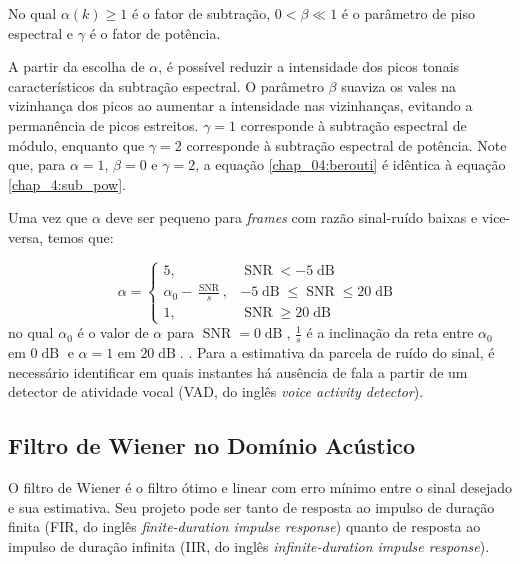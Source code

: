 No qual $\alpha(k) \geq 1$  é o fator de subtração, $0 < \beta \ll 1 $ é o
parâmetro de piso espectral\cite{berouti1979enhancement} e $\gamma$ é o fator de potência.

A partir da escolha de $\alpha$, é possível reduzir a intensidade dos picos
tonais característicos da subtração espectral. O parâmetro $\beta$ suaviza os
vales na vizinhança dos picos ao aumentar a intensidade nas vizinhanças,
evitando a permanência de picos estreitos.
$\gamma = 1$ corresponde
à subtração espectral de módulo, enquanto que $\gamma = 2$ corresponde à
subtração espectral de potência. Note que, para $\alpha = 1$, $\beta = 0$ e
$\gamma = 2$, a equação \eqref{chap_04:berouti} é idêntica à equação
\eqref{chap_4:sub_pow}.


Uma vez que $\alpha$ deve ser pequeno para \textit{frames} com razão sinal-ruído
baixas e vice-versa, temos que:

\begin{equation}
    \alpha = 
    \begin{cases}
        5, & \operatorname{SNR} < -5\operatorname{dB} \\
        \alpha_0 - \frac{\operatorname{SNR}}{s}, & -5\operatorname{dB} \leq \operatorname{SNR} \leq 20\operatorname{dB}\\
        1, & \operatorname{SNR} \geq 20\operatorname{dB}
    \end{cases}
\end{equation}
no qual $\alpha_0$ é o valor de $\alpha$ para $\operatorname{SNR} =
0\operatorname{dB}$, $\frac{1}{s}$ é a inclinação da reta entre $\alpha_0$ em
$0\operatorname{dB}$ e $\alpha = 1$ em $20\operatorname{dB}$. . Para a estimativa da parcela de ruído do sinal, é
necessário identificar em quais instantes há ausência de fala a partir de um
detector de atividade vocal (VAD, do inglês \textit{voice activity detector}).


\subsection{Filtro de Wiener no Domínio Acústico}

O filtro de Wiener é o filtro ótimo e linear com erro mínimo entre o sinal
desejado e sua estimativa. Seu projeto pode ser tanto de resposta ao impulso de
duração finita (FIR, do inglês \textit{finite-duration impulse response}) quanto
de resposta ao impulso de duração infinita (IIR, do inglês
\textit{infinite-duration impulse response})\cite{loizou}.

